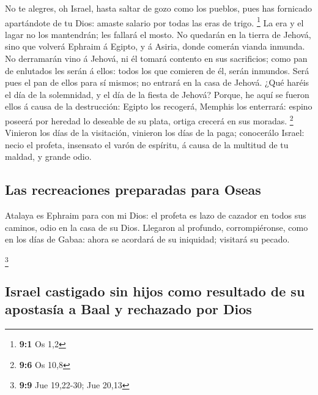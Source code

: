  No te alegres, oh Israel, hasta saltar de gozo como los
pueblos, pues has fornicado apartándote de tu Dios: amaste salario por
todas las eras de trigo. \footnote{\textbf{9:1} Os 1,2} 
La era y el lagar no los mantendrán; les fallará el mosto.
 No quedarán en la tierra de Jehová, sino que volverá
Ephraim á Egipto, y á Asiria, donde comerán vianda inmunda.
 No derramarán vino á Jehová, ni él tomará contento en sus
sacrificios; como pan de enlutados les serán á ellos: todos los que
comieren de él, serán inmundos. Será pues el pan de ellos para sí
mismos; no entrará en la casa de Jehová.  ¿Qué haréis el
día de la solemnidad, y el día de la fiesta de Jehová? 
Porque, he aquí se fueron ellos á causa de la destrucción: Egipto los
recogerá, Memphis los enterrará: espino poseerá por heredad lo deseable
de su plata, ortiga crecerá en sus moradas. \footnote{\textbf{9:6} Os
  10,8}  Vinieron los días de la visitación, vinieron los
días de la paga; conocerálo Israel: necio el profeta, insensato el varón
de espíritu, á causa de la multitud de tu maldad, y grande odio.

\hypertarget{las-recreaciones-preparadas-para-oseas}{%
\subsection{Las recreaciones preparadas para
Oseas}\label{las-recreaciones-preparadas-para-oseas}}

 Atalaya es Ephraim para con mi Dios: el profeta es lazo
de cazador en todos sus caminos, odio en la casa de su Dios.
 Llegaron al profundo, corrompiéronse, como en los días de
Gabaa: ahora se acordará de su iniquidad; visitará su pecado.

\footnote{\textbf{9:9} Jue 19,22-30; Jue 20,13}

\hypertarget{israel-castigado-sin-hijos-como-resultado-de-su-apostasuxeda-a-baal-y-rechazado-por-dios}{%
\subsection{Israel castigado sin hijos como resultado de su apostasía a
Baal y rechazado por
Dios}\label{israel-castigado-sin-hijos-como-resultado-de-su-apostasuxeda-a-baal-y-rechazado-por-dios}}

